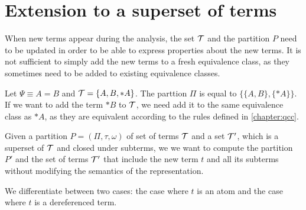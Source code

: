 \section{Extension to a superset of terms}

When new terms appear during the analysis, the set $\mathcal{T}$ and the partition $P$ need to be updated
in order to be able to express properties about the new terms.
It is not sufficient to simply add the new terms to a fresh equivalence class,
as they sometimes need to be added to existing equivalence classes.

\begin{example}
    Let $\Psi \equiv A = B$ and $\mathcal{T} = \{A, B, *A\}$.
    The parttion $\Pi$ is equal to $\{\{A, B\}, \{*A\}\}$.
    If we want to add the term $*B$ to $\mathcal{T}$, we need add it to the same equivalence class as $*A$,
    as they are equivalent according to the rules defined in \cref{chapter:qcc}.
\end{example}

Given a partition $P = (\Pi, \tau, \omega)$ of set of terms $\mathcal{T}$ and a set $\mathcal{T}'$, which is a superset of $\mathcal{T}$ and closed under subterms,
we
we want to compute the partition $P'$ and the set of terms $\mathcal{T}'$ that include the new term $t$
and all its subterms without modifying the semantics of the representation.

We differentiate between two cases: the case where $t$ is an atom and the case where $t$ is a dereferenced term.
